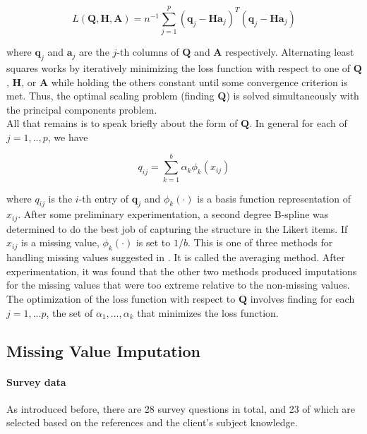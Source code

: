 \documentclass[12pt]{article}
\begin{document}
\begin{equation}
L(\textbf{Q},\textbf{H},\textbf{A})=n^{-1} \sum_{j=1}^p (\textbf{q}_j-\textbf{H}\textbf{a}_j)^T(\textbf{q}_j-\textbf{H}\textbf{a}_j)
\end{equation}

where $\textbf{q}_j$ and $\textbf{a}_j$ are the $j$-th columns of $\textbf{Q}$ and $\textbf{A}$ respectively. Alternating least squares works by iteratively minimizing the loss function with respect to one of $\textbf{Q}$, $\textbf{H}$, or $\textbf{A}$ while holding the others constant until some convergence criterion is met. Thus, the optimal scaling problem (finding $\textbf{Q}$) is solved simultaneously with the principal components problem. \\

All that remains is to speak briefly about the form of $\textbf{Q}$. In general for each of $j=1,..,p$, we have

\begin{equation}
q_{ij}=\sum_{k=1}^b \alpha_k\phi_k(x_{ij})
\end{equation}

where $q_{ij}$ is the $i$-th entry of $\textbf{q}_j$ and $\phi_k(\cdot)$ is a basis function representation of $x_{ij}$. After some preliminary experimentation, a second degree B-spline was determined to do the best job of capturing the structure in the Likert items. If $x_{ij}$ is a missing value, $\phi_k(\cdot)$ is set to $1/b$. This is one of three methods for handling missing values suggested in \cite{de2011multivariate}. It is called the averaging method. After experimentation, it was found that the other two methods produced imputations for the missing values that were too extreme relative to the non-missing values. The optimization of the loss function with respect to $\textbf{Q}$ involves finding for each $j=1,...p$, the set of $\alpha_1,...,\alpha_k$ that minimizes the loss function. 

\subsection{Missing Value Imputation} \label{sec:misimpute}
\paragraph{Survey data} As introduced before, there are 28 survey questions in total, and 23 of which are selected based on the references and the client's subject knowledge.  
\end{document}
